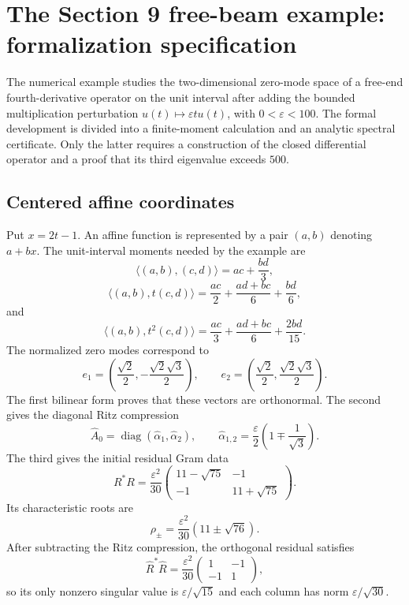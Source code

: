 
\section{The Section 9 free-beam example: formalization specification}

The numerical example studies the two-dimensional zero-mode space of a
free-end fourth-derivative operator on the unit interval after adding the
bounded multiplication perturbation $u(t) \mapsto \varepsilon t u(t)$, with
$0<\varepsilon<100$.  The formal development is divided into a finite-moment
calculation and an analytic spectral certificate.  Only the latter requires a
construction of the closed differential operator and a proof that its third
eigenvalue exceeds $500$.

\subsection{Centered affine coordinates}

Put $x=2t-1$.  An affine function is represented by a pair $(a,b)$ denoting
$a+bx$.  The unit-interval moments needed by the example are
\[
 \langle(a,b),(c,d)\rangle=ac+\frac{bd}{3},
\]
\[
 \langle(a,b),t(c,d)\rangle
 =\frac{ac}{2}+\frac{ad+bc}{6}+\frac{bd}{6},
\]
and
\[
 \langle(a,b),t^2(c,d)\rangle
 =\frac{ac}{3}+\frac{ad+bc}{6}+\frac{2bd}{15}.
\]
The normalized zero modes correspond to
\[
 e_1=\left(\frac{\sqrt2}{2},-\frac{\sqrt2\sqrt3}{2}\right),
 \qquad
 e_2=\left(\frac{\sqrt2}{2}, \frac{\sqrt2\sqrt3}{2}\right).
\]
The first bilinear form proves that these vectors are orthonormal.  The second
gives the diagonal Ritz compression
\[
 \widehat A_0=\operatorname{diag}(\widehat\alpha_1,
 \widehat\alpha_2),\qquad
 \widehat\alpha_{1,2}
 =\frac{\varepsilon}{2}\left(1\mp\frac1{\sqrt3}\right).
\]
The third gives the initial residual Gram data
\[
 R^*R=\frac{\varepsilon^2}{30}
 \begin{pmatrix}11-\sqrt{75}&-1\\-1&11+\sqrt{75}\end{pmatrix}.
\]
Its characteristic roots are
\[
 \rho_{\pm}=\frac{\varepsilon^2}{30}(11\pm\sqrt{76}).
\]
After subtracting the Ritz compression, the orthogonal residual satisfies
\[
 \widehat R^*\widehat R=
 \frac{\varepsilon^2}{30}
 \begin{pmatrix}1&-1\\-1&1\end{pmatrix},
\]
so its only nonzero singular value is $\varepsilon/\sqrt{15}$ and each column
has norm $\varepsilon/\sqrt{30}$.

